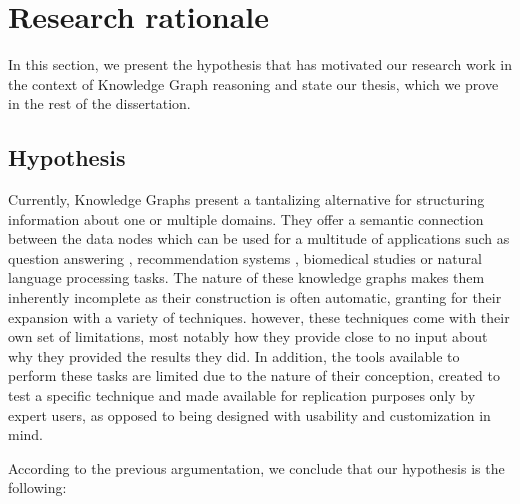 \section{Research rationale}\label{sec:intro-rationale}
In this section, we present the hypothesis that has motivated our research work in the context of Knowledge Graph reasoning and state our thesis, which we prove in the rest of the dissertation.

\subsection{Hypothesis}

Currently, Knowledge Graphs present a tantalizing alternative for structuring information about one or multiple domains. They offer a semantic connection between the data nodes which can be used for a multitude of applications such as question answering \cite{cui2023incorporating, cui2023reinforcement}, recommendation systems \cite{xian2019reinforcement}, biomedical studies \cite{nicholson2020constructing} or natural language processing tasks. The nature of these knowledge graphs makes them inherently incomplete as their construction is often automatic, granting for their expansion with a variety of techniques. 
however, these techniques \cite{bordes2013translating, wang2014knowledge, lin2015learning, sun2019rotate, trouillon2016complex, nickel2011three, balavzevic2019tucker, socher2013reasoning, lao2011random, das2017go, xiong2017deeppath, lin2018multi, xian2019reinforcement, tiwari2021dapath} come with their own set of limitations, most notably how they provide close to no input about why they provided the results they did. In addition, the tools available to perform these tasks are limited due to the nature of their conception, created to test a specific technique and made available for replication purposes only by expert users, as opposed to being designed with usability and customization in mind.

According to the previous argumentation, we conclude that our hypothesis is the following:


